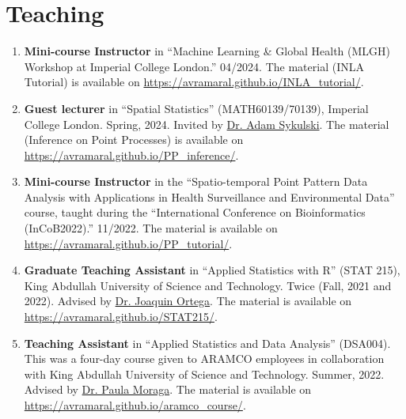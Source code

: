 \documentclass[10pt, ]{article}
\begin{document}
	\vspace{10pt}
	
	\vspace{-12pt}
	\section*{Teaching} \vspace{-5pt}
	
	\begin{enumerate}[noitemsep, topsep=0pt]
		\item \textbf{Mini-course Instructor} in ``Machine Learning \& Global Health (MLGH) Workshop at Imperial College London.'' 04/2024. The material (INLA Tutorial) is available on  \href{https://avramaral.github.io/INLA_tutorial/}{\url{https://avramaral.github.io/INLA_tutorial/}}.
		
		\item \textbf{Guest lecturer} in ``Spatial Statistics'' (MATH60139/70139), Imperial College London. Spring, 2024. Invited by \href{https://www.imperial.ac.uk/people/adam.sykulski}{Dr. Adam Sykulski}. The material (Inference on Point Processes) is available on \href{https://avramaral.github.io/PP_inference/}{\url{https://avramaral.github.io/PP_inference/}}.
		
		\item \textbf{Mini-course Instructor} in the ``Spatio-temporal Point Pattern Data Analysis with Applications in Health Surveillance and Environmental Data'' course, taught during the ``International Conference on Bioinformatics (InCoB2022).'' 11/2022. The material is available on  \href{https://avramaral.github.io/PP_tutorial/}{\url{https://avramaral.github.io/PP_tutorial/}}.
		
		\item \textbf{Graduate Teaching Assistant} in ``Applied Statistics with R'' (STAT 215), King Abdullah University of Science and Technology. Twice (Fall, 2021 and 2022). Advised by \href{https://cemse.kaust.edu.sa/people/person/joaquin-ortega-sanchez}{Dr. Joaquin Ortega}. The material is available on \href{https://avramaral.github.io/STAT215/}{\url{https://avramaral.github.io/STAT215/}}.
		
		\item \textbf{Teaching Assistant} in ``Applied Statistics and Data Analysis'' (DSA004). This was a four-day course given to ARAMCO employees in collaboration with King Abdullah University of Science and Technology. Summer, 2022. Advised by \href{https://www.paulamoraga.com/}{Dr. Paula Moraga}. The material is available on \href{https://avramaral.github.io/aramco\_course/}{\url{https://avramaral.github.io/aramco\_course/}}.
		

\end{enumerate}
\end{document}
